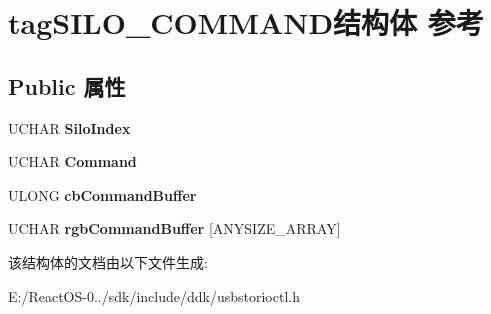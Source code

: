 \hypertarget{structtag_s_i_l_o___c_o_m_m_a_n_d}{}\section{tag\+S\+I\+L\+O\+\_\+\+C\+O\+M\+M\+A\+N\+D结构体 参考}
\label{structtag_s_i_l_o___c_o_m_m_a_n_d}
\subsection*{Public 属性}
\begin{DoxyCompactItemize}
\item 
\mbox{\label{structtag_s_i_l_o___c_o_m_m_a_n_d_a2a4f92be58b202266462dab048a4b0b2}} 
U\+C\+H\+AR {\bfseries Silo\+Index}
\item 
\mbox{\label{structtag_s_i_l_o___c_o_m_m_a_n_d_ab4e89935bdeb9576dcfaa682eeb703f0}} 
U\+C\+H\+AR {\bfseries Command}
\item 
\mbox{\label{structtag_s_i_l_o___c_o_m_m_a_n_d_a9835fe2ca9a68ae43c830f6e25522cf0}} 
U\+L\+O\+NG {\bfseries cb\+Command\+Buffer}
\item 
\mbox{\label{structtag_s_i_l_o___c_o_m_m_a_n_d_ade595604432fd70fa4c99e8c57086984}} 
U\+C\+H\+AR {\bfseries rgb\+Command\+Buffer} \mbox{[}A\+N\+Y\+S\+I\+Z\+E\+\_\+\+A\+R\+R\+AY\mbox{]}
\end{DoxyCompactItemize}


该结构体的文档由以下文件生成\+:\begin{DoxyCompactItemize}
\item 
E\+:/\+React\+O\+S-\/0../sdk/include/ddk/usbstorioctl.\+h\end{DoxyCompactItemize}
